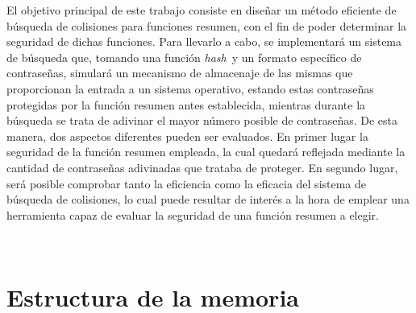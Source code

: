 \documentclass[12pt,spanish,listoffigures,listoftables]{tfgetsinf}
\newcommand{\hash}{\textit{hash}}
\begin{document}
    
    
    

El objetivo principal de este trabajo consiste en diseñar un método eficiente de búsqueda de colisiones para funciones resumen, con el fin de poder determinar la seguridad de dichas funciones. Para llevarlo a cabo, se implementará un sistema de búsqueda que, tomando una función \hash~y un formato específico de contraseñas, simulará un mecanismo de almacenaje de las mismas que proporcionan la entrada a un sistema operativo, estando estas contraseñas protegidas por la función resumen antes establecida, mientras durante la búsqueda se trata de adivinar el mayor número posible de contraseñas. De esta manera, dos aspectos diferentes pueden ser evaluados. En primer lugar la seguridad de la función resumen empleada, la cual quedará reflejada mediante la cantidad de contraseñas adivinadas que trataba de proteger. En segundo lugar, será posible comprobar tanto la eficiencia como la eficacia del sistema de búsqueda de colisiones, lo cual puede resultar de interés a la hora de emplear una herramienta capaz de evaluar la seguridad de una función resumen a elegir.

~\\

\section{Estructura de la memoria}

\end{document}

